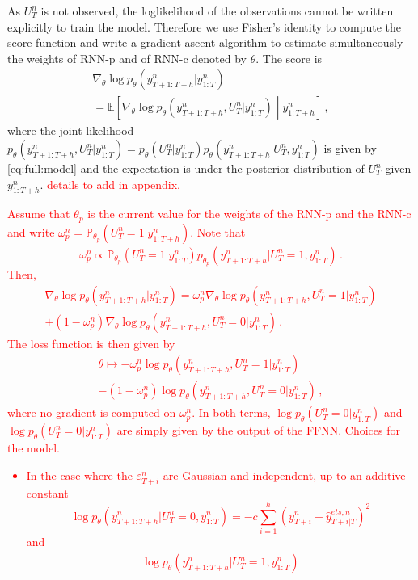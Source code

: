 \documentclass{article} %
\newcommand{\ts}{y}
\newcommand{\etspred}{\hat{y}}
\begin{document}
As $U^n_T$ is not observed, the loglikelihood of the observations cannot be written explicitly to train the model. Therefore we use Fisher's identity to compute the score function and write a gradient ascent algorithm to estimate simultaneously the weights of RNN-p and of RNN-c denoted by $\theta$. The score is
\begin{multline*}
\nabla_\theta \log p_\theta(\ts^n_{T+1:T+h}|\ts^n_{1:T})
\\ = \mathbb{E}\left[\nabla_\theta \log p_\theta(\ts^n_{T+1:T+h},U_T^n|\ts^n_{1:T})\middle|\ts^n_{1:T+h}\right]\,,
\end{multline*}
where the joint likelihood $p_\theta(\ts^n_{T+1:T+h},U_T^n|\ts^n_{1:T}) = p_\theta(U_T^n|\ts^n_{1:T})p_\theta(\ts^n_{T+1:T+h}|U_T^n,\ts^n_{1:T})$ is given by \eqref{eq:full:model} and the expectation is under the posterior distribution of $U_T^n$ given $\ts^n_{1:T+h}$.  \textcolor{red}{details to add in appendix.} \textcolor{red}{Assume that $\theta_p$ is the current value for the weights of the RNN-p and the RNN-c and write $\omega_p^n = \mathbb{P}_{\theta_p}(U_T^n = 1|\ts^n_{1:T+h})$. Note that
$$
\omega_p^n \propto \mathbb{P}_{\theta_p}(U_T^n = 1|\ts^n_{1:T})p_{\theta_p}(\ts^n_{T+1:T+h}|U_T^n=1,\ts^n_{1:T})\,.
$$
Then,
\begin{multline*}
\nabla_\theta \log p_\theta(\ts^n_{T+1:T+h}|\ts^n_{1:T}) = \omega_p^n\nabla_\theta \log p_\theta(\ts^n_{T+1:T+h},U_T^n=1|\ts^n_{1:T})\\
+ (1-\omega_p^n)\nabla_\theta \log p_\theta(\ts^n_{T+1:T+h},U_T^n=0|\ts^n_{1:T})\,.
\end{multline*}
The loss function is then given by
\begin{multline*}
\theta\mapsto - \omega_p^n \log p_\theta(\ts^n_{T+1:T+h},U_T^n=1|\ts^n_{1:T})\\
- (1-\omega_p^n) \log p_\theta(\ts^n_{T+1:T+h},U_T^n=0|\ts^n_{1:T})\,,
\end{multline*} 
where no gradient is computed on $\omega_p^n$. In both terms, $\log p_\theta(U_T^n=0|\ts^n_{1:T})$ and $\log p_\theta(U_T^n=0|\ts^n_{1:T})$ are simply given by the output of the FFNN.  Choices for the model.
\begin{itemize}
\item In the case where the  $\varepsilon^n_{T+i}$ are Gaussian and independent, up to an additive constant
$$
\log p_\theta(\ts^n_{T+1:T+h}|U_T^n=0,\ts^n_{1:T}) = -c\sum_{i=1}^{h}(\ts^n_{T+i}  - \etspred^{ets,n}_{T+i|T})^2
$$
and
\begin{multline*}
\log p_\theta(\ts^n_{T+1:T+h}|U_T^n=1,\ts^n_{1:T})\\

\end{multline*}
\end{itemize}}
\end{document}
